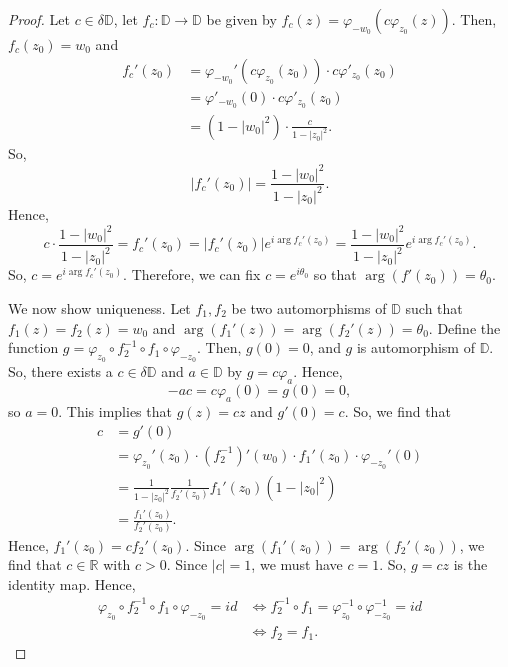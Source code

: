 \documentclass[a4paper, openany]{memoir}
\theoremstyle{definition}
\theoremstyle{plain}
\begin{document}
    \begin{proof}
        Let $c \in \delta \mathbb{D}$, let $f_c \colon \mathbb{D} \to \mathbb{D}$ be given by $f_c(z) = \varphi_{-w_0} (c \varphi_{z_0}(z))$. Then, $f_c(z_0) = w_0$ and
        \begin{align*}
            f_c'(z_0) &= \varphi_{-w_0}'(c\varphi_{z_0}(z_0)) \cdot c \varphi'_{z_0}(z_0) \\
            &= \varphi'_{-w_0}(0) \cdot c \varphi'_{z_0}(z_0) \\
            &= (1 - |w_0|^2) \cdot \frac{c}{1 - |z_0|^2}.
        \end{align*}
        So,
        \[|f_c'(z_0)| = \frac{1 - |w_0|^2}{1 - |z_0|^2}.\]
        Hence,
        \[c \cdot \frac{1 - |w_0|^2}{1 - |z_0|^2}= f_c'(z_0) = |f_c'(z_0)| e^{i \arg f_c'(z_0)} = \frac{1 - |w_0|^2}{1 - |z_0|^2} e ^{i \arg f_c'(z_0)}.\]
        So, $c = e^{i \arg f_c'(z_0)}$. Therefore, we can fix $c = e^{i \theta_0}$ so that $\arg(f'(z_0)) = \theta_0$.

        We now show uniqueness. Let $f_1, f_2$ be two automorphisms of $\mathbb{D}$ such that $f_1(z) = f_2(z) = w_0$ and $\arg(f_1'(z)) = \arg(f_2'(z)) = \theta_0$. Define the function $g = \varphi_{z_0} \circ f_2^{-1} \circ f_1 \circ \varphi_{-z_0}$. Then, $g(0) = 0$, and $g$ is automorphism of $\mathbb{D}$. So, there exists a $c \in \delta \mathbb{D}$ and $a \in \mathbb{D}$ by $g = c \varphi_a$. Hence,
        \[-ac = c\varphi_a(0) = g(0) = 0,\]
        so $a = 0$. This implies that $g(z) = cz$ and $g'(0) = c$. So, we find that
        \begin{align*}
            c &= g'(0) \\
            &= \varphi_{z_0}'(z_0) \cdot (f_2^{-1})'(w_0) \cdot f_1'(z_0) \cdot \varphi_{-z_0}'(0) \\
            &= \frac{1}{1 - |z_0|^2} \frac{1}{f_2'(z_0)} f_1'(z_0) (1 - |z_0|^2) \\
            &= \frac{f_1'(z_0)}{f_2'(z_0)}.
        \end{align*}
        Hence, $f_1'(z_0) = cf_2'(z_0)$. Since $\arg (f_1'(z_0)) = \arg (f_2'(z_0))$, we find that $c \in \mathbb{R}$ with $c > 0$. Since $|c| = 1$, we must have $c = 1$. So, $g = cz$ is the identity map. Hence,
        \begin{align*}
            \varphi_{z_0} \circ f_2^{-1} \circ f_1 \circ \varphi_{-z_0} = id &\iff f_2^{-1} \circ f_1 = \varphi_{z_0}^{-1} \circ \varphi_{-z_0}^{-1} = id \\
            &\iff f_2 = f_1.
        \end{align*}
    \end{proof}
\end{document}
